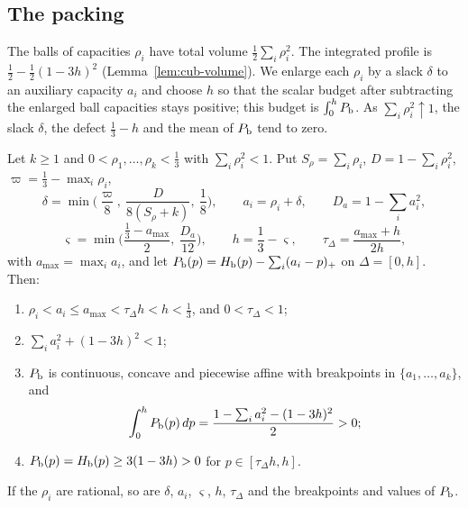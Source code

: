 \subsection{The packing}

The balls of capacities $\rho_i$ have total volume $\frac12\sum_i\rho_i^2$. The integrated profile is
$\frac12-\frac12(1-3h)^2$ (Lemma~\ref{lem:cub-volume}). We enlarge each $\rho_i$ by a slack $\delta$ to an auxiliary capacity
$a_i$ and choose $h$ so that the scalar budget after subtracting the enlarged ball capacities stays positive;
this budget is $\int_0^hP_{\mathrm b}$. As $\sum_i\rho_i^2\uparrow1$, the slack $\delta$, the defect $\frac13-h$ and the mean of $P_{\mathrm b}$
tend to zero.

\begin{lemma}\label{lem:cub-auxiliary}
Let $k\ge1$ and $0<\rho_1,\dots,\rho_k<\frac13$ with $\sum_i\rho_i^2<1$. Put $S_\rho=\sum_i\rho_i$, $D=1-\sum_i\rho_i^2$,
$\varpi=\frac13-\max_i\rho_i$,
\[
 \delta=\min\Big(\frac{\varpi}8,\ \frac{D}{8(S_\rho+k)},\ \frac18\Big),\qquad a_i=\rho_i+\delta,\qquad
 D_a=1-\sum_ia_i^2,
\]
\[
 \varsigma=\min\Big(\frac{\frac13-a_{\max}}2,\ \frac{D_a}{12}\Big),\qquad h=\frac13-\varsigma,\qquad
 \tau_\Delta=\frac{a_{\max}+h}{2h},
\]
with $a_{\max}=\max_ia_i$, and let $P_{\mathrm b}(p)=H_{\mathrm b}(p)-\sum_i(a_i-p)_+$ on $\Delta=[0,h]$. Then:
\begin{enumerate}[label=(\roman*)]
\item $\rho_i<a_i\le a_{\max}<\tau_\Delta h<h<\frac13$, and $0<\tau_\Delta<1$;
\item $\sum_ia_i^2+(1-3h)^2<1$;
\item $P_{\mathrm b}$ is continuous, concave and piecewise affine with breakpoints in $\{a_1,\dots,a_k\}$, and
\[
 \int_0^hP_{\mathrm b}(p)\,dp=\frac{1-\sum_ia_i^2-(1-3h)^2}{2}>0 ;
\]
\item $P_{\mathrm b}(p)=H_{\mathrm b}(p)\ge3(1-3h)>0$ for $p\in[\tau_\Delta h,h]$.
\end{enumerate}
If the $\rho_i$ are rational, so are $\delta$, $a_i$, $\varsigma$, $h$, $\tau_\Delta$ and the breakpoints and values of $P_{\mathrm b}$.
\end{lemma}

